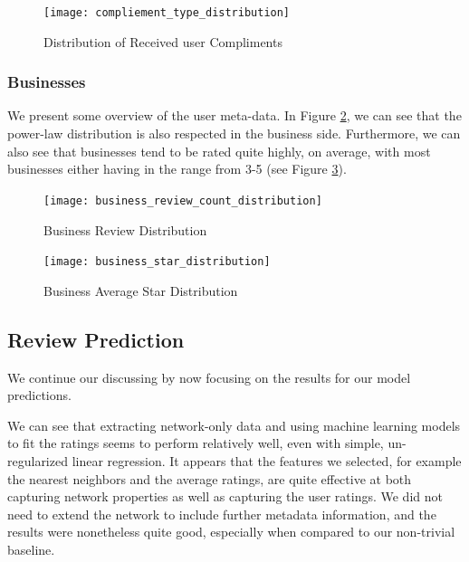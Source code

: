\documentclass[letterpaper, 10 pt, conference]{ieeeconf}  %
\begin{document}
\begin{figure}[h!]
\centering
\texttt{[image: compliement\_type\_distribution]}
\caption{Distribution of Received user Compliments}
\label{fig:user_compliment_distribution}
\end{figure}

\subsubsection{Businesses}
We present some overview of the user meta-data. In Figure \ref{fig:business_review_distribution}, we can see that the power-law distribution is also respected in the business side. Furthermore, we can also see that businesses tend to be rated quite highly, on average, with most businesses either having in the range from 3-5 (see Figure \ref{fig:business_star_distribution}).

\begin{figure}[h!]
\centering
\texttt{[image: business\_review\_count\_distribution]}
\caption{Business Review Distribution}
\label{fig:business_review_distribution}
\end{figure}

\begin{figure}[h!]
\centering
\texttt{[image: business\_star\_distribution]}
\caption{Business Average Star Distribution}
\label{fig:business_star_distribution}
\end{figure}

\subsection{Review Prediction}
We continue our discussing by now focusing on the results for our model predictions.

We can see that extracting network-only data and using machine learning models to fit the ratings seems to perform relatively well, even with simple, un-regularized linear regression. It appears that the features we selected, for example the nearest neighbors and the average ratings, are quite effective at both capturing network properties as well as capturing the user ratings. We did not need to extend the network to include further metadata information, and the results were nonetheless quite good, especially when compared to our non-trivial baseline.
\end{document}
